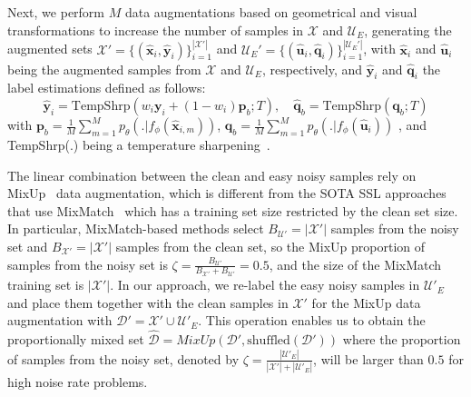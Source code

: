 \documentclass{bmvc2k}
\begin{document}
Next, we perform $M$ data augmentations based on geometrical and visual transformations to increase the number of samples in $\mathcal{X}$ and $\mathcal{U}_{E}$, generating the augmented sets $\mathcal{X}'=\{(\hat{\mathbf{x}}_i,\hat{\mathbf{y}}_i)\}_{i=1}^{|\mathcal{X}'|}$ and $\mathcal{U}_E'=\{(\hat{\mathbf{u}}_i,\hat{\mathbf{q}}_i)\}_{i=1}^{|\mathcal{U}_E'|}$, with $\hat{\mathbf{x}}_i$ and $\hat{\mathbf{u}}_i$ being the augmented samples from $\mathcal{X}$ and $\mathcal{U}_E$, respectively, and $\hat{\mathbf{y}}_i$ and $\hat{\mathbf{q}}_i$ the label estimations defined as follows:
\begin{equation}
    \hat{\mathbf{y}}_i = \text{TempShrp}(w_i \mathbf{y}_i + (1-w_i)\mathbf{p}_b;T),  \quad 
                \hat{\mathbf{q}}_b = \text{TempShrp}(\mathbf{q}_b;T)
\end{equation}
with  $\mathbf{p}_b =  \frac{1}{M}\sum\limits_{m=1}^{M}
p_{\theta}(.|f_{\phi}(\hat{\mathbf{x}}_{i,m}))$,  
$\mathbf{q}_b = \frac{1}{M}\sum\limits_{m=1}^{M} p_{\theta}(.|f_{\phi}(\hat{\mathbf{u}}_{i}))$ , and TempShrp(.) being a temperature sharpening~\citep{DivideMix}.


The linear combination between the clean and easy noisy samples rely on MixUp~\citep{mixup} data augmentation, which is different from the
SOTA SSL approaches~\citep{DivideMix} that use MixMatch~\citep{MixMatch} which has a training set size restricted by the clean set size. 
In particular, MixMatch-based methods select $B_{\mathcal{U}'}=|\mathcal{X}'|$ samples from the noisy set and $B_{\mathcal{X}'} = |\mathcal{X}'|$ samples from the clean set, so the MixUp proportion of samples from the noisy set is $\zeta=\frac{B_{\mathcal{U}'}}{{B_{\mathcal{X}'}+B_{\mathcal{U}'}}}=0.5$, and the size of the MixMatch training set is $|\mathcal{X}'|$. 
In our approach, we re-label the easy noisy samples in $\mathcal{U}'_E$ and place them together with the clean samples in $\mathcal{X}'$ for the MixUp data augmentation with $\mathcal{D}'=\mathcal{X}'\cup \mathcal{U}'_E$.  This operation enables us to obtain the proportionally mixed set $\hat{\mathcal{D}}=MixUp(\mathcal{D}',\text{shuffled}(\mathcal{D}'))$ where the proportion of samples from the noisy set, denoted by $\zeta=\frac{|\mathcal{U}'_E|}{|\mathcal{X}'|+|\mathcal{U}'_E|}$, will be larger than $0.5$ for high noise rate problems. 
\end{document}
